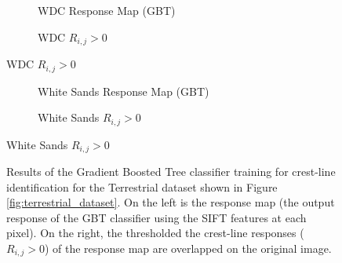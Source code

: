 \begin{figure}[H]
	\ContinuedFloat
	\centering
	\begin{subfigure}{0.48\textwidth}
		\centering
		\caption{WDC Response Map (GBT)}
		\label{fig:WDC_gbt_response}
	\end{subfigure}
	\begin{subfigure}{0.48\textwidth}
		\centering
		\caption{ WDC $R_{i,j} > 0$}
		\label{fig:WDC_gbt_response_overlay}
	\end{subfigure}
\end{figure}
\begin{figure}[H]
	\ContinuedFloat
	\centering
	\begin{subfigure}{0.48\textwidth}
		\centering
		\caption{White Sands Response Map (GBT)}
		\label{fig:WhiteSands_gbt_response}
	\end{subfigure}
	\begin{subfigure}{0.48\textwidth}
		\centering
		\caption{ White Sands $R_{i,j} > 0$}
		\label{fig:WhiteSands_gbt_response_overlay}
	\end{subfigure}
\end{figure}
\begin{figure}[H]
	\ContinuedFloat
	\centering
	\caption{Results of the Gradient Boosted Tree classifier training for crest-line identification for the Terrestrial dataset shown in Figure \ref{fig:terrestrial_dataset}. On the left is the response map (the output response of the GBT classifier using the SIFT features at each pixel). On the right, the thresholded the crest-line responses ($R_{i,j} > 0$) of the response map are overlapped on the original image. }
	\label{fig:gbt_response_results}
\end{figure}


